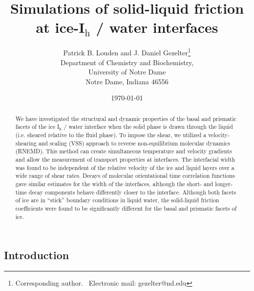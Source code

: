 \documentclass[11pt]{article}
\begin{document}
\title{Simulations of solid-liquid friction at ice-I$_\mathrm{h}$ /
  water interfaces}

\author{Patrick B. Louden and J. Daniel 
Gezelter\footnote{Corresponding author. \ Electronic mail:
  gezelter@nd.edu} \\
Department of Chemistry and Biochemistry,\\
University of Notre Dame\\
Notre Dame, Indiana 46556}

\date{\today}
\maketitle
\begin{doublespace}


\begin{abstract}
  We have investigated the structural and dynamic properties of the
  basal and prismatic facets of the ice I$_\mathrm{h}$ / water
  interface when the solid phase is drawn through the liquid
  (i.e. sheared relative to the fluid phase). To impose the shear, we
  utilized a velocity-shearing and scaling (VSS) approach to reverse
  non-equilibrium molecular dynamics (RNEMD).  This method can create
  simultaneous temperature and velocity gradients and allow the
  measurement of transport properties at interfaces.  The interfacial
  width was found to be independent of the relative velocity of the
  ice and liquid layers over a wide range of shear rates.  Decays of
  molecular orientational time correlation functions gave similar
  estimates for the width of the interfaces, although the short- and
  longer-time decay components behave differently closer to the
  interface.  Although both facets of ice are in ``stick'' boundary
  conditions in liquid water, the solid-liquid friction coefficients
  were found to be significantly different for the basal and prismatic
  facets of ice.
\end{abstract}

\newpage

\section{Introduction}


\end{doublespace}
\end{document}
